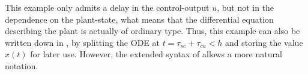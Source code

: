         This example only admits a delay in the control-output $u$, but not in the dependence on the plant-state, what means that the differential equation describing the plant is actually of ordinary type. Thus, this example can also be written down in \dL, by splitting the ODE at $t=\tau_{sc}+\tau_{ca}<h$ and storing the value $x(t)$ for later use. However, the extended syntax of \ddL allows a more natural notation.

        




